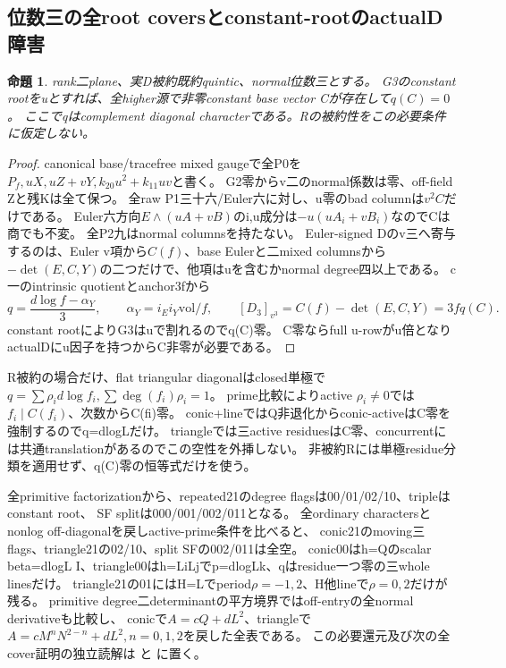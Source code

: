 \documentclass[a4paper,11pt]{ltjsarticle}
\newtheorem{proposition}{命題}[section]
\theoremstyle{definition}
\begin{document}
\subsection{位数三の全root coversとconstant-rootのactualD障害}
\begin{proposition}\label{prop:plane-m3-constant-root-obstruction}
rank二plane、実D被約既約quintic、normal位数三とする。
G3のconstant rootをuとすれば、全higher源で非零constant base vector Cが存在して$q(C)=0$。
ここでqはcomplement diagonal characterである。Rの被約性をこの必要条件に仮定しない。
\end{proposition}
\begin{proof}
canonical base/tracefree mixed gaugeで全P0を
$P_f,uX,uZ+vY,k_{20}u^2+k_{11}uv$と書く。
G2零からv二のnormal係数は零、off-field Zと残Kは全て保つ。
全raw P1三十六/Euler六に対し、u零のbad columnは$v^2C$だけである。
Euler六方向$E\wedge(uA+vB)$のi,u成分は$-u(uA_i+vB_i)$なのでCは商でも不変。
全P2九はnormal columnsを持たない。
Euler-signed Dのv三へ寄与するのは、Euler v項から$C(f)$、base Eulerと二mixed columnsから
$-\det(E,C,Y)$の二つだけで、他項はuを含むかnormal degree四以上である。
c一のintrinsic quotientとanchor3fから
\[
 q=\frac{d\log f-\alpha_Y}{3},\qquad
 \alpha_Y=i_Ei_Y\mathrm{vol}/f,\qquad
 [D_3]_{v^3}=C(f)-\det(E,C,Y)=3fq(C).
\]
constant rootによりG3はuで割れるのでq(C)零。
C零ならfull u-rowがu倍となりactualDにu因子を持つからC非零が必要である。
\end{proof}
R被約の場合だけ、flat triangular diagonalはclosed単極で
$q=\sum\rho_i d\log f_i,\sum\deg(f_i)\rho_i=1$。
prime比較によりactive $\rho_i\ne0$では$f_i\mid C(f_i)$、次数からC(fi)零。
conic+lineではQ非退化からconic-activeはC零を強制するのでq=dlogLだけ。
triangleでは三active residuesはC零、concurrentには共通translationがあるのでこの空性を外挿しない。
非被約Rには単極residue分類を適用せず、q(C)零の恒等式だけを使う。

全primitive factorizationから、repeated21のdegree flagsは00/01/02/10、tripleはconstant root、
SF splitは000/001/002/011となる。
全ordinary charactersとnonlog off-diagonalを戻しactive-prime条件を比べると、
conic21のmoving三flags、triangle21の02/10、split SFの002/011は全空。
conic00はh=Qのscalar beta=dlogL I、triangle00はh=LiLjでp=dlogLk、qはresidue一つ零の三whole linesだけ。
triangle21の01にはH=Lでperiod$\rho=-1,2$、H他lineで$\rho=0,2$だけが残る。
primitive degree二determinantの平方境界ではoff-entryの全normal derivativeも比較し、
conicで$A=cQ+dL^2$、triangleで$A=cM^nN^{2-n}+dL^2,n=0,1,2$を戻した全表である。
この必要還元及び次の全cover証明の独立読解は
と
に置く。
\end{document}
